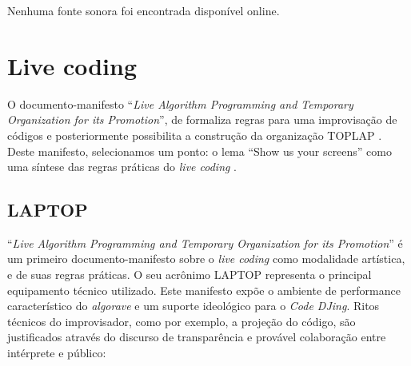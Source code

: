 Nenhuma fonte sonora foi encontrada disponível online. 

\section{Live coding}\label{sec:laptoptoplap}

O documento-manifesto ``\emph{Live Algorithm Programming and Temporary Organization for its Promotion}'', de  formaliza regras para uma improvisação de códigos e posteriormente possibilita a construção da organização TOPLAP .  Deste manifesto, selecionamos um ponto: o lema ``Show us your screens'' como uma síntese das regras práticas do \emph{live coding} .

\subsection{LAPTOP}\label{sec:laptop}

``\emph{Live Algorithm Programming and Temporary Organization for its Promotion}'' \cite{ward_live_2004,blackwell_programming_2005} é um primeiro documento-manifesto sobre o \emph{live coding} como modalidade artística, e de suas regras práticas. O seu acrônimo LAPTOP representa o principal equipamento técnico utilizado. Este manifesto expõe o ambiente de performance característico do \emph{algorave} e um suporte ideológico para o \emph{Code DJing}. Ritos técnicos do improvisador, como por exemplo, a projeção do código, são justificados através do discurso de transparência e provável colaboração entre intérprete e público:

